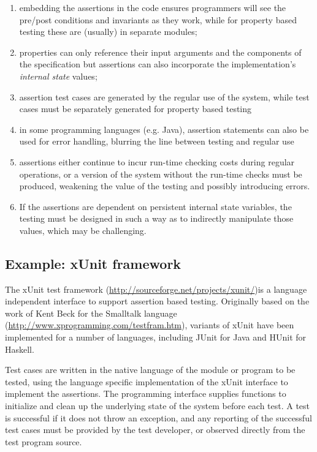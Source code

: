 \begin{enumerate}
\item embedding the assertions in the code ensures programmers will 
see the pre/post conditions and invariants as they work,
while for property based testing these are (usually) in separate modules;
\item properties can only reference 
their input arguments and the components of the specification
but assertions can also incorporate the implementation's \emph{internal state} values;
\item assertion test cases are generated by the regular use of the system,
while test cases must be separately generated for property based testing
\item in some programming languages (e.g. Java),
assertion statements can also be used for error handling,
blurring the line between testing and regular use
\item assertions either continue to incur 
run-time checking costs during regular operations,
or a version of the system without the run-time checks must be produced,
weakening the value of the testing and possibly introducing errors.
\item If the assertions are dependent on persistent internal state variables,
the testing must be designed in such a way as to indirectly manipulate those values,
which may be challenging.
\end{enumerate}

\subsection{Example: xUnit framework}

The xUnit test framework (\url{http://sourceforge.net/projects/xunit/})is 
a language independent interface to support assertion based testing.
Originally based on the work of Kent Beck for the Smalltalk language
(\url{http://www.xprogramming.com/testfram.htm}),
variants of xUnit have been implemented for a number of languages, 
including JUnit for Java and HUnit for Haskell.

Test cases are written in 
the native language of the module or program to be tested,
using the language specific implementation of 
the xUnit interface to implement the assertions.
The programming interface supplies functions to initialize and clean up
the underlying state of the system before each test.
A test is successful if it does not throw an exception,
and any reporting of the successful test cases must be
provided by the test developer,
or observed directly from the test program source.

